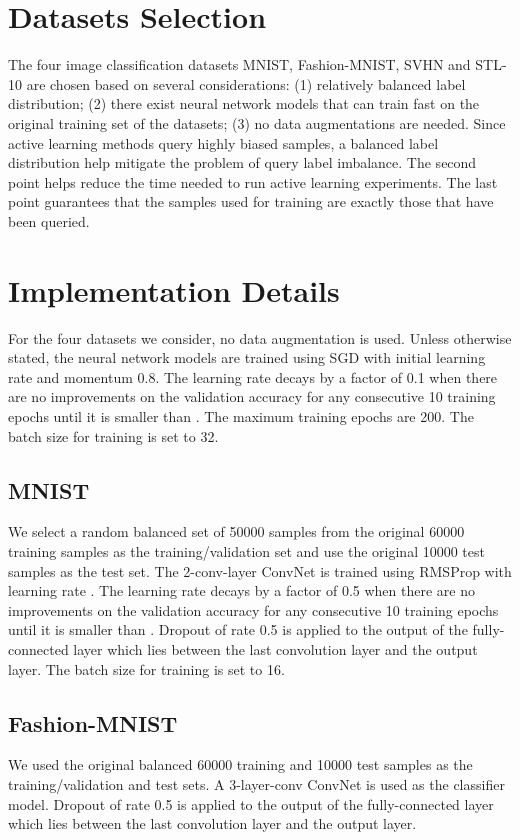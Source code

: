 \documentclass[runningheads, envcountsame, a4paper]{llncs}
\begin{document}
\section{Datasets Selection}
The four image classification datasets MNIST, Fashion-MNIST, SVHN and STL-10 are chosen based on several considerations: (1) relatively balanced label distribution; (2) there exist neural network models that can train fast on the original training set of the datasets; (3) no data augmentations are needed. Since active learning methods query highly biased samples, a balanced label distribution help mitigate the problem of query label imbalance. The second point helps reduce the time needed to run active learning experiments. The last point guarantees that the samples used for training are exactly those that have been queried.


\section{Implementation Details}
For the four datasets we consider, no data augmentation is used. Unless otherwise stated, the neural network models are trained using SGD with initial learning rate  and momentum 0.8. The learning rate decays by a factor of 0.1 when there are no improvements on the validation accuracy for any consecutive 10 training epochs until it is smaller than . The maximum training epochs are 200. The batch size for training is set to 32. 

\subsection{MNIST \cite{Lecun10} }
We select a random balanced set of 50000 samples from the original 60000 training samples as the training/validation set and use the original 10000 test samples as the test set. The 2-conv-layer ConvNet is trained using RMSProp \cite{Tieleman12} with learning rate . The learning rate decays by a factor of 0.5 when there are no improvements on the validation accuracy for any consecutive 10 training epochs until it is smaller than . Dropout \cite{Srivastava14} of rate 0.5 is applied to the output of the fully-connected layer which lies between the last convolution layer and the output layer. The batch size for training is set to 16.

\subsection{Fashion-MNIST \cite{Xiao17} }
We used the original balanced 60000 training and 10000 test samples as the training/validation and test sets. A 3-layer-conv ConvNet is used as the classifier model. Dropout of rate 0.5 is applied to the output of the fully-connected layer which lies between the last convolution layer and the output layer. 
\end{document}
